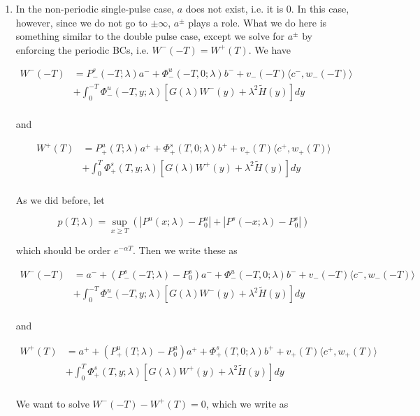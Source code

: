 \documentclass[12pt]{article}
\begin{document}
\begin{enumerate}
\item In the non-periodic single-pulse case, $a$ does not exist, i.e. it is 0. In this case, however, since we do not go to $\pm \infty$, $a^\pm$ plays a role. What we do here is something similar to the double pulse case, except we solve for $a^\pm$ by enforcing the periodic BCs, i.e. $W^-(-T) = W^+(T)$. We have 


\begin{align*}
W^-(-T) &= P^s_-(-T; \lambda)a^- + \Phi^u_-(-T, 0; \lambda)b^- + v_-(-T) \langle c^-, w_-(-T) \rangle \\
&+ \int_0^{-T} \Phi^u_-(-T, y; \lambda)[ G(\lambda)W^-(y) + \lambda^2 \tilde{H}(y) ] dy \\
\end{align*}

and

\begin{align*}
W^+(T) &= P^u_+(T; \lambda)a^+ + \Phi^s_+(T, 0; \lambda)b^+ + v_+(T) \langle c^+, w_+(T) \rangle \\
&+ \int_0^T \Phi^s_+(T, y; \lambda) [ G(\lambda)W^+(y) + \lambda^2 \tilde{H}(y) ] dy \\
\end{align*}

As we did before, let

\[
p(T;\lambda) = \sup_{x \geq T} (|P^u(x;\lambda) - P_0^u| + |P^s(-x;\lambda) - P_0^s|)
\]

which should be order $e^{-\alpha T}$. Then we write these as

\begin{align*}
W^-(-T) &= a^- + (P^s_-(-T; \lambda) - P_0^s)a^- + \Phi^u_-(-T, 0; \lambda)b^- + v_-(-T) \langle c^-, w_-(-T) \rangle \\
&+ \int_0^{-T} \Phi^u_-(-T, y; \lambda)[ G(\lambda)W^-(y) + \lambda^2 \tilde{H}(y) ] dy \\
\end{align*}

and

\begin{align*}
W^+(T) &= a^+ + (P^u_+(T; \lambda) - P_0^u)a^+ + \Phi^s_+(T, 0; \lambda)b^+ + v_+(T) \langle c^+, w_+(T) \rangle \\
&+ \int_0^T \Phi^s_+(T, y; \lambda) [ G(\lambda)W^+(y) + \lambda^2 \tilde{H}(y) ] dy \\
\end{align*}

We want to solve $W^-(-T) - W^+(T) = 0$, which we write as


\end{enumerate}
\end{document}
